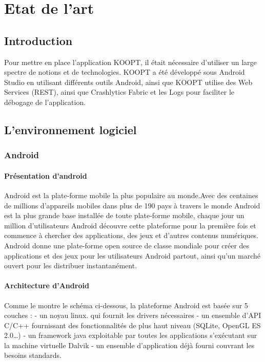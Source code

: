 \chapter{Etat de l'art}
\label{sec:etat de l'art}

\section*{Introduction}

Pour mettre en place l’application KOOPT, il était nécessaire d’utiliser un large spectre de notions et de technologies. KOOPT a été développé sous Android Studio en utilisant différents outils Android, ainsi que KOOPT utilise des Web Services (REST), ainsi que Crashlytics Fabric et les Logs pour faciliter le débogage de l’application.



\section{L’environnement logiciel}
\subsection{Android}
\subsubsection{Présentation d’android}
Android est la plate-forme mobile la plus populaire au monde.Avec des centaines de millions d'appareils mobiles dans plus de 190 pays à travers le monde Android est la plus grande base installée de toute plate-forme mobile, chaque jour un million d’utilisateurs Android découvre cette plateforme pour la première fois et commence à chercher des applications, des jeux et d'autres contenus numériques.
Android donne une plate-forme open source de classe mondiale pour créer des applications et des jeux pour les utilisateurs Android partout, ainsi qu'un marché ouvert pour les distribuer instantanément.

\subsubsection{Architecture d’Android}


Comme le montre le schéma ci-dessous, la plateforme Android est basée sur 5 couches :
- un noyau linux.  qui fournit les drivers nécessaires 
- un ensemble d’API C/C++ fournissant des fonctionnalités de plus haut niveau (SQLite, OpenGL ES 2.0…)
- un framework java exploitable par toutes les applications s’exécutant sur la machine virtuelle Dalvik
- un ensemble d’application déjà fourni couvrant les besoins standards.
 
